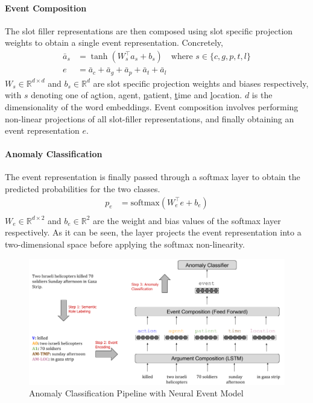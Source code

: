 \paragraph{Event Composition} The slot filler representations are then composed using slot specific
projection weights to obtain a single event representation. Concretely,
\begin{align}
 \bar{a}_s &= \tanh(W_s^\intercal a_s + b_s) \quad \text{where } s \in \{c,g,p,t,l\} \\
 e &=  \bar{a}_c + \bar{a}_g + \bar{a}_p + \bar{a}_t + \bar{a}_l 
\end{align}
$W_s \in \mathbb{R}^{d \times d}$ and $b_s \in \mathbb{R}^{d}$ are slot specific projection weights and biases respectively, with $s$ denoting one of a\underline{c}tion,
a\underline{g}ent, \underline{p}atient, \underline{t}ime and \underline{l}ocation. $d$ is the dimensionality of the word embeddings.
Event composition involves performing non-linear projections of all slot-filler representations, and finally obtaining an event representation
$e$.

\paragraph{Anomaly Classification} The event representation is finally passed through a softmax layer to obtain
the predicted probabilities for the two classes.
\begin{align}
 p_e & = \text{softmax}(W_e^\intercal e + b_e) \\
\end{align}
$W_e \in \mathbb{R}^{d \times 2}$ and $b_e \in \mathbb{R}^2$ are the weight and bias values of the softmax layer respectively.
As it can be seen, the layer projects the event representation into a two-dimensional space before applying the softmax non-linearity.

\begin{figure}
  \begin{center}
  \includegraphics[width=6.5in]{figures/nem_pipeline.png}
  \caption{Anomaly Classification Pipeline with Neural Event Model}
  \label{fig:nem}
  \end{center}
\end{figure}

